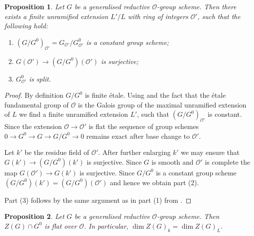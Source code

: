 \documentclass{amsart}
\newtheorem{prop}{Proposition}[section]
\theoremstyle{definition}
\theoremstyle{remark}
\newcommand{\stackcite}[1]{\cite[\href{https://stacks.math.columbia.edu/tag/#1}{Tag #1}]{stacks-project}}
\newcommand{\OO}{\mathcal O}
\begin{document}
\begin{prop}\label{O_prime}
    Let $G$ be a generalised reductive $\OO$-group scheme.
    Then there exists a finite unramified extension $L'/L$ with ring of integers $\OO'$, such that the following hold:
    \begin{enumerate}
        \item $(G/G^0)_{\OO'} = G_{\OO'}/G_{\OO'}^0$ is a constant group scheme;
        \item $G(\OO')\rightarrow (G/G^0)(\OO')$ is surjective;
        \item $G^0_{\OO'}$ is split.
    \end{enumerate}
\end{prop}

\begin{proof}
    By definition $G/G^0$ is finite \'etale.
    Using \stackcite{0BND} and the fact that the \'etale fundamental group of $\OO$ is the Galois group of the maximal unramified extension of $L$ we find a finite unramified extension $L'$, such that $(G/G^0)_{\OO'}$ is constant. Since the extension $\OO\rightarrow \OO'$ is flat the sequence
    of group schemes $0\rightarrow G^0\rightarrow G \rightarrow G/G^0\rightarrow 0$ remains exact after base
    change to $\OO'$. 

    Let $k'$ be the residue field of $\OO'$. After further enlarging $k'$ we may ensure that 
    $G(k')\rightarrow (G/G^0)(k')$ is surjective. Since $G$ is smooth and  $\OO'$ is complete 
    the map $G(\OO')\rightarrow G(k')$ is surjective. Since $G/G^0$ is a constant group scheme
    $(G/G^0)(k')=(G/G^0)(\OO')$ and hence we obtain part (2). 

Part (3) follows by the same argument as in part (1) from \cite[Lemma 5.1.3]{bcnrd}.
\end{proof}

\begin{prop}\label{dimkisdimL} Let $G$ be a generalised reductive $\OO$-group scheme. Then $Z(G) \cap G^0$ is flat over $\OO$. In particular, $\dim Z(G)_k = \dim Z(G)_L$. 
\end{prop}
\end{document}
